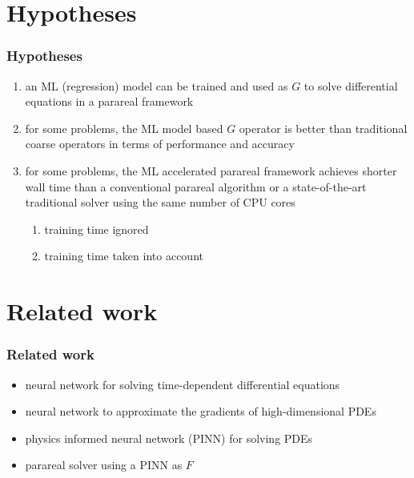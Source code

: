 \documentclass[xcolor=x11names,compress,usenames,dvipsnames,mathsans]{beamer}
\begin{document}

\section{Hypotheses}

\begin{frame}
\frametitle{Hypotheses}
\begin{enumerate}
	\item an ML (regression) model can be trained and used as $G$ to solve differential equations in a parareal framework
	\item for some problems, the ML model based $G$ operator is better than traditional coarse operators in terms of performance and accuracy
	\item for some problems, the ML accelerated parareal framework achieves shorter wall time than a conventional parareal algorithm or a state-of-the-art traditional solver using the same number of CPU cores
	\begin{enumerate}[a]
	    \item training time ignored
	    \item training time taken into account
	\end{enumerate}
\end{enumerate}
\end{frame}


\section{Related work}

\begin{frame}
\frametitle{Related work}
\begin{itemize}
    \item neural network for solving time-dependent differential equations \cite{regazzoni2019}
    \item neural network to approximate the gradients of high-dimensional PDEs \cite{han2018}
    \item physics informed neural network (PINN) for solving PDEs \cite{raissi2017} \cite{sirignano2018} \cite{lu2019}
    \item parareal solver using a PINN as $F$ \cite{meng2019}
\end{itemize}
\end{frame}

\end{document}
